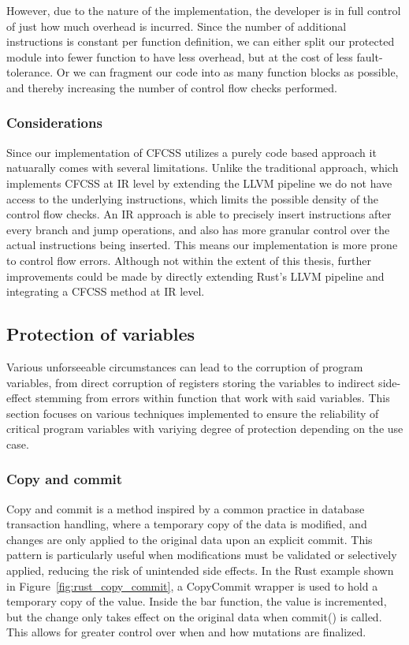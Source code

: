 \documentclass[12pt, letterpaper]{article}
\begin{document}
However, due to the nature of the implementation, the developer is in full control of just how much overhead is incurred. Since the number of additional instructions is constant per function definition, we can either split our protected module into fewer function to have less overhead, but at the cost of less fault-tolerance. Or we can fragment our code into as many function blocks as possible, and thereby increasing the number of control flow checks performed.

\subsubsection{Considerations}

Since our implementation of CFCSS utilizes a purely code based approach it natuarally comes with several limitations. Unlike the traditional approach, which implements CFCSS at IR level by extending the LLVM pipeline we do not have access to the underlying instructions, which limits the possible density of the control flow checks. An IR approach is able to precisely insert instructions after every branch and jump operations, and also has more granular control over the actual instructions being inserted. This means our implementation is more prone to control flow errors. Although not within the extent of this thesis, further improvements could be made by directly extending Rust's LLVM pipeline and integrating a CFCSS method at IR level.

\clearpage
\subsection{Protection of variables} \label{sec:var_protection}

Various unforseeable circumstances can lead to the corruption of program variables, from direct corruption of registers storing the variables to indirect side-effect stemming from errors within function that work with said variables. This section focuses on various techniques implemented to ensure the reliability of critical program variables with variying degree of protection depending on the use case.

\subsubsection{Copy and commit}

Copy and commit is a method inspired by a common practice in database transaction handling, where a temporary copy of the data is modified, and changes are only applied to the original data upon an explicit commit. This pattern is particularly useful when modifications must be validated or selectively applied, reducing the risk of unintended side effects. In the Rust example shown in Figure~\ref{fig:rust_copy_commit}, a CopyCommit wrapper is used to hold a temporary copy of the value. Inside the bar function, the value is incremented, but the change only takes effect on the original data when commit() is called. This allows for greater control over when and how mutations are finalized.
\end{document}
